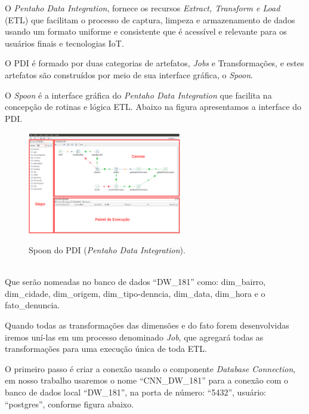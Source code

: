 O \textit{Pentaho Data Integration}, fornece os recursos \textit{Extract, Transform e Load} (ETL) que facilitam o processo de captura, limpeza e armazenamento de dados usando um formato uniforme e consistente que \'{e} acessível e relevante para os usu\'{a}rios finais e tecnologias IoT.

O PDI \'{e} formado por duas categorias de artefatos, \textit{Jobs} e Transforma\c{c}\~{o}es, e estes artefatos s\~{a}o construídos por meio de sua interface gr\'{a}fica, o \textit{Spoon}. 

O \textit{Spoon} \'{e} a interface gr\'{a}fica do \textit{Pentaho Data Integration} que facilita na concep\c{c}\~{a}o de rotinas e l\'ogica ETL. Abaixo na figura apresentamos a interface do PDI.

\begin{figure}[H]
	\vspace*{0,2cm}
    \centering
    \caption{Spoon do PDI (\textit{Pentaho Data Integration}).}
    \includegraphics[width=0.6\textwidth]{./04-figuras/figura-pentaho-pdi-spoon}
    \label{fig:ilustfigpentaho-pdi-spoon}
\end{figure}
\vspace*{-0,9cm}
{\raggedright {}} \\

Que ser\~{a}o nomeadas no banco de dados ``DW\_181'' como: dim\_bairro, dim\_cidade, dim\_origem, dim\_tipo-denncia, dim\_data, dim\_hora e o fato\_denuncia.

Quando todas as transforma\c{c}\~{o}es das dimens\~{o}es e do fato forem desenvolvidas iremos uní-las em um processo denominado \textit{Job}, que agregar\'{a} todas as transforma\c{c}\~{o}es para uma execu\c{c}\~{a}o única de toda ETL.

O primeiro passo \'{e} criar a conex\~{a}o usando o componente \textit{Database Connection}, em nosso trabalho usaremos o nome ``CNN\_DW\_181'' para a conex\~{a}o com o banco de dados local ``DW\_181'', na porta de número: ``5432'', usu\'{a}rio: ``postgres'', conforme figura abaixo.

